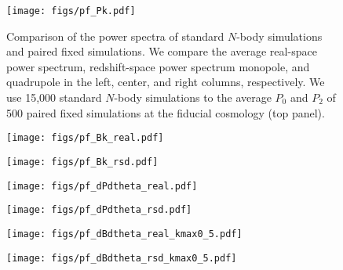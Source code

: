 \begin{figure}
\begin{center}
    \texttt{[image: figs/pf\_Pk.pdf]} 
    \caption{Comparison of the power spectra of standard $N$-body simulations 
    and paired fixed simulations. We compare the average real-space power spectrum, 
    redshift-space power spectrum monopole, and quadrupole in the left, center, 
    and right columns, respectively. We use 15,000 standard $N$-body simulations 
    to the average $P_0$ and $P_2$ of 500 paired fixed simulations at the 
    fiducial cosmology (top panel).
    }
\label{fig:pk_real}
\end{center}
\end{figure}


\begin{figure}
\begin{center}
    \texttt{[image: figs/pf\_Bk\_real.pdf]} 
    \caption{}
\label{fig:bk_real}
\end{center}
\end{figure}

\begin{figure}
\begin{center}
    \texttt{[image: figs/pf\_Bk\_rsd.pdf]} 
    \caption{}
\label{fig:bk_rsd}
\end{center}
\end{figure}

\begin{figure}
\begin{center}
    \texttt{[image: figs/pf\_dPdtheta\_real.pdf]}
    \caption{}
\label{fig:dpk_real}
\end{center}
\end{figure}

\begin{figure}
\begin{center}
    \texttt{[image: figs/pf\_dPdtheta\_rsd.pdf]}
    \caption{}
\label{fig:dpk_rsd}
\end{center}
\end{figure}

\begin{figure}
\begin{center}
    \texttt{[image: figs/pf\_dBdtheta\_real\_kmax0\_5.pdf]}
    \caption{}
\label{fig:dbk_real}
\end{center}
\end{figure}


\begin{figure}
\begin{center}
    \texttt{[image: figs/pf\_dBdtheta\_rsd\_kmax0\_5.pdf]}
    \caption{}
\label{fig:dbk_rsd}
\end{center}
\end{figure}

